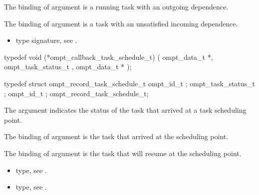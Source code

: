 \argdesc

The binding of argument  is a running task
with an outgoing dependence.

The binding of argument  is a task with an
unsatisfied incoming dependence.


\crossreferences
\begin{itemize}
\item {} type signature, see
.
\end{itemize}



\label{sec:ompt_callback_task_schedule_t}
\format

\begin{ccppspecific}
\begin{omptCallback}
typedef void (*ompt_callback_task_schedule_t) (
  ompt_data_t *,
  ompt_task_status_t ,
  ompt_data_t *
);
\end{omptCallback}
\end{ccppspecific}


\record

\begin{ccppspecific}
\begin{omptRecord}
typedef struct ompt_record_task_schedule_t {
  ompt_id_t ;
  ompt_task_status_t ;
  ompt_id_t ;
} ompt_record_task_schedule_t;
\end{omptRecord}
\end{ccppspecific}


\argdesc

The argument  indicates the status of
the task that arrived at a task scheduling point.

The binding of argument  is the task that
arrived at the scheduling point.

The binding of argument  is the task that
will resume at the scheduling point.

\crossreferences
\begin{itemize}
\item {} type, see
.

\item {} type, see
.
\end{itemize}



